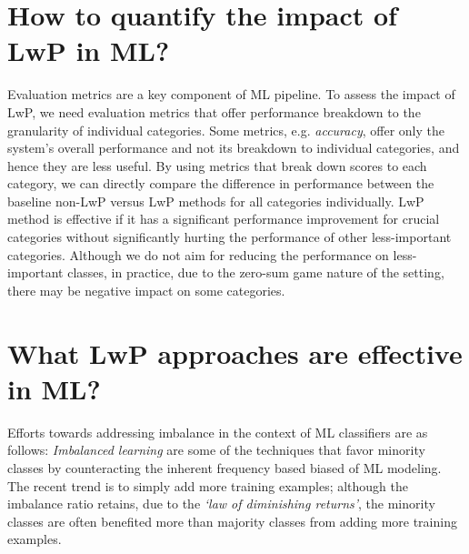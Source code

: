 \section{How to quantify the impact of LwP in ML?}
Evaluation metrics are a key component of ML pipeline.
To assess the impact of LwP, we need evaluation metrics that offer performance breakdown to the granularity of individual categories.
Some metrics, e.g. \textit{accuracy},  offer only the system's overall performance and not its breakdown to individual categories, and hence they are less useful.
By using metrics that break down scores to each category, we can directly compare the difference in performance between the baseline non-LwP versus LwP methods for all categories individually.
LwP method is effective if it has a significant performance improvement for crucial categories without significantly hurting the performance of other less-important categories. 
Although we do not aim for reducing the performance on less-important classes, in practice, due to the zero-sum game nature of the setting, there may be negative impact on some categories.

\section{What LwP approaches are effective in ML?}
Efforts towards addressing imbalance in the context of ML classifiers are as follows:
\textit{Imbalanced learning} are some of the techniques that favor minority classes by counteracting the inherent frequency based biased of ML modeling.
The recent trend is to simply add more training examples; although the imbalance ratio retains,  due to the \textit{`law of diminishing returns'}, the minority classes are often benefited more than majority classes from adding more training examples.
